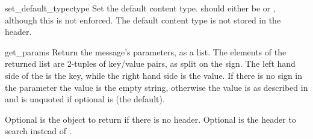 \begin{methoddesc}[Message]{set_default_type}{ctype}
Set the default content type.   should either be
 or , although this is
not enforced.  The default content type is not stored in the
 header.

\end{methoddesc}

\begin{methoddesc}[Message]{get_params}{}
Return the message's  parameters, as a list.  The
elements of the returned list are 2-tuples of key/value pairs, as
split on the \character{=} sign.  The left hand side of the
\character{=} is the key, while the right hand side is the value.  If
there is no \character{=} sign in the parameter the value is the empty
string, otherwise the value is as described in  and is
unquoted if optional  is  (the default).

Optional  is the object to return if there is no
 header.  Optional  is the header to
search instead of .

\end{methoddesc}

